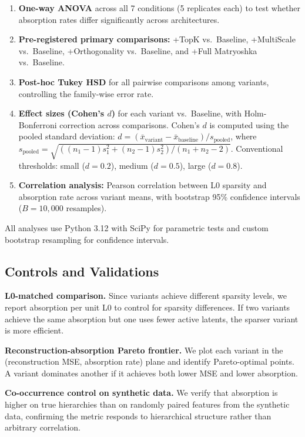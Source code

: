 \documentclass{article}
\begin{document}
\begin{enumerate}
\item \textbf{One-way ANOVA} across all 7 conditions (5 replicates each) to test whether absorption rates differ significantly across architectures.

\item \textbf{Pre-registered primary comparisons:} +TopK vs.~Baseline, +MultiScale vs.~Baseline, +Orthogonality vs.~Baseline, and +Full Matryoshka vs.~Baseline.

\item \textbf{Post-hoc Tukey HSD} for all pairwise comparisons among variants, controlling the family-wise error rate.

\item \textbf{Effect sizes (Cohen's $d$)} for each variant vs.~Baseline, with Holm-Bonferroni correction across comparisons. Cohen's $d$ is computed using the pooled standard deviation: $d = (\bar{x}_{\text{variant}} - \bar{x}_{\text{baseline}}) / s_{\text{pooled}}$, where $s_{\text{pooled}} = \sqrt{((n_1 - 1)s_1^2 + (n_2 - 1)s_2^2) / (n_1 + n_2 - 2)}$. Conventional thresholds: small ($d = 0.2$), medium ($d = 0.5$), large ($d = 0.8$).

\item \textbf{Correlation analysis:} Pearson correlation between L0 sparsity and absorption rate across variant means, with bootstrap 95\% confidence intervals ($B = 10{,}000$ resamples).
\end{enumerate}

All analyses use Python 3.12 with SciPy \citep{virtanen2020scipy} for parametric tests and custom bootstrap resampling for confidence intervals.

\subsection{Controls and Validations}

\textbf{L0-matched comparison.} Since variants achieve different sparsity levels, we report absorption per unit L0 to control for sparsity differences. If two variants achieve the same absorption but one uses fewer active latents, the sparser variant is more efficient.

\textbf{Reconstruction-absorption Pareto frontier.} We plot each variant in the (reconstruction MSE, absorption rate) plane and identify Pareto-optimal points. A variant dominates another if it achieves both lower MSE and lower absorption.

\textbf{Co-occurrence control on synthetic data.} We verify that absorption is higher on true hierarchies than on randomly paired features from the synthetic data, confirming the metric responds to hierarchical structure rather than arbitrary correlation.
\end{document}
